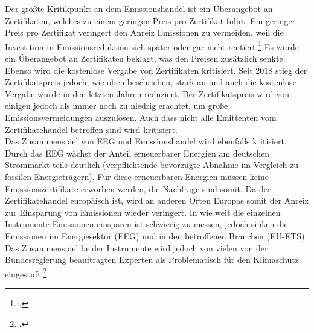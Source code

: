 Der größte Kritikpunkt an dem Emissionshandel ist ein Überangebot an Zertifikaten, welches zu einem geringen Preis pro Zertifikat führt.
Ein geringer Preis pro Zertifikat veringert den Anreiz Emissionen zu vermeiden, weil die Investition in Emissionsreduktion sich später oder gar nicht rentiert.\footcite[Vgl. auch im Folgenden][]{Matthes2017}
Es wurde ein Überangebot an Zertifikaten beklagt, was den Preisen zusätzlich senkte.
Ebenso wird die kostenlose Vergabe von Zertifikaten kritisiert.
Seit 2018 stieg der Zertifikatspreis jedoch, wie oben beschrieben, stark an und auch die kostenlose Vergabe wurde in den letzten Jahren reduziert.
Der Zertifikatspreis wird von einigen jedoch als immer noch zu niedrig erachtet, um große Emissionsvermeidungen auszulösen.
Auch dass nicht alle Emittenten vom Zertifikatehandel betroffen sind wird kritisiert.\\
Das Zusammenspiel von EEG und Emissionshandel wird ebenfalls kritisiert.
Durch das EEG wächst der Anteil erneuerbarer Energien am deutschen Strommarkt teils deutlich (verpflichtende bevorzugte Abnahme im Vergleich zu fossilen Energieträgern).
Für diese erneuerbaren Energien müssen keine Emissionszertifikate erworben werden, die Nachfrage sind somit.
Da der Zertifikatehandel europäisch ist, wird an anderen Orten Europas somit der Anreiz zur Einsparung von Emissionen wieder veringert.
In wie weit die einzelnen Instrumente Emissionen einsparen ist schwierig zu messen, jedoch sinken die Emissionen im Energiesektor (EEG) und in den betroffenen Branchen (EU-ETS). Das Zusammenspiel beider Instrumente wird jedoch von vielen von der Bundesregierung beauftragten Experten als Problematisch für den Klimaschutz eingestuft.\footcite[Vgl. u.a.][]{SachverstandigenratzurBegutachtungdergesamtwirtschaftlichenEntwicklung}
